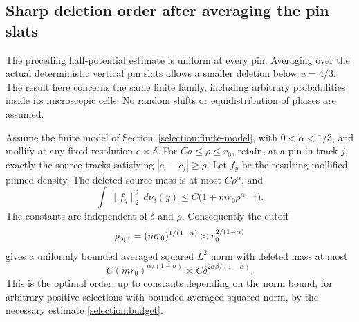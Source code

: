 \subsection{Sharp deletion order after averaging the pin slats}
\label{selection:sharp-section}

The preceding half-potential estimate is uniform at every pin. Averaging
over the actual deterministic vertical pin slats allows a smaller deletion
below \(u=4/3\). The result here concerns the same finite family, including
arbitrary probabilities inside its microscopic cells. No random shifts
or equidistribution of phases are assumed.

\begin{theorem}
\label{selection:sharp-theorem}
Assume the finite model of Section~\ref{selection:finite-model}, with
\(0<\alpha<1/3\), and mollify at any fixed resolution
\(\epsilon\asymp\delta\). For \(Ca\le\rho\le r_0\), retain,
at a pin in track \(j\), exactly the source tracks satisfying
\( |c_i-c_j|\ge\rho\). Let \(f_y\) be the resulting mollified
pinned density. The deleted source mass is at most \(C\rho^\alpha\),
and
\begin{equation}\label{selection:sharp-bound}
 \int\|f_y\|_2^2\,d\nu_\delta(y)
 \le C\bigl(1+mr_0\rho^{\alpha-1}\bigr).
\end{equation}
The constants are independent of \(\delta\) and \(\rho\).
Consequently the cutoff
\begin{equation}\label{selection:optimal-cutoff}
 \rho_{\rm opt}=(mr_0)^{1/(1-\alpha)}
       \asymp r_0^{2/(1-\alpha)}
\end{equation}
gives a uniformly bounded averaged squared \(L^2\) norm with deleted
mass at most
\begin{equation}\label{selection:sharp-budget}
 C(mr_0)^{\alpha/(1-\alpha)}
       \asymp C\delta^{2\alpha\beta/(1-\alpha)}.
\end{equation}
This is the optimal order, up to constants depending on the norm bound,
for arbitrary positive selections with bounded averaged squared norm,
by the necessary estimate \eqref{selection:budget}.
\end{theorem}

